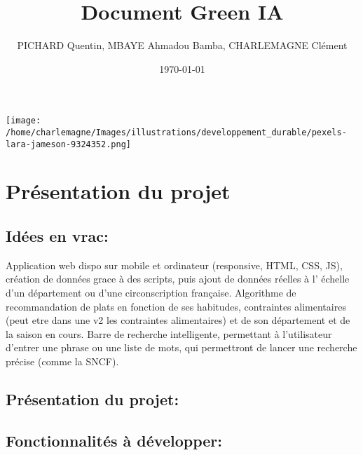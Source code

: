 \documentclass[11pt]{article}
\title{Document Green IA}
\author{PICHARD Quentin, MBAYE Ahmadou Bamba, CHARLEMAGNE Clément}
\date{\today}
\begin{document}
\maketitle

\begin{center}
    \texttt{[image: /home/charlemagne/Images/illustrations/developpement\_durable/pexels-lara-jameson-9324352.png]}
\end{center}

\section{\textcolor{section}{Présentation du projet}}
\subsection*{\textcolor{sub_section}{Idées en vrac:}}
Application web dispo sur mobile et ordinateur (responsive, HTML, CSS, JS),
création de données grace à des scripts, puis ajout de données réelles à l'
échelle d'un département ou d'une circonscription française. Algorithme de recommandation 
de plats en fonction de ses habitudes, contraintes alimentaires (peut etre dans une v2 les 
contraintes alimentaires) et de son département et de la saison en cours. Barre de recherche 
intelligente, permettant à l'utilisateur d'entrer une phrase ou une liste de mots, qui 
permettront de lancer une recherche précise (comme la SNCF). 

\subsection*{\textcolor{sub_section}{Présentation du projet:}}

\subsection*{\textcolor{sub_section}{Fonctionnalités à développer:}}
\end{document}
